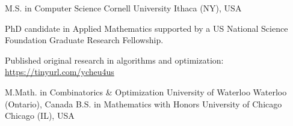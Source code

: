

\begin{cventries}

  \cventry
    {M.S. in Computer Science} %
    {Cornell University} %
    {Ithaca (NY), USA} %
    {} %
    {
      \begin{cvitems} %
        \item {PhD candidate in Applied Mathematics supported by a US National Science Foundation Graduate Research Fellowship.}
        \item {Published original research in algorithms and optimization: \url{https://tinyurl.com/ycheu4us}}
      \end{cvitems}
    }

  \cventry
    {M.Math. in Combinatorics \& Optimization} %
    {University of Waterloo} %
    {Waterloo (Ontario), Canada} %
    {} %
    {}
  \vspace{-1.0mm}
  \cventry
    {B.S. in Mathematics with Honors} %
    {University of Chicago} %
    {Chicago (IL), USA} %
    {} %
    {}
  \vspace{-1.0mm}
\end{cventries}
